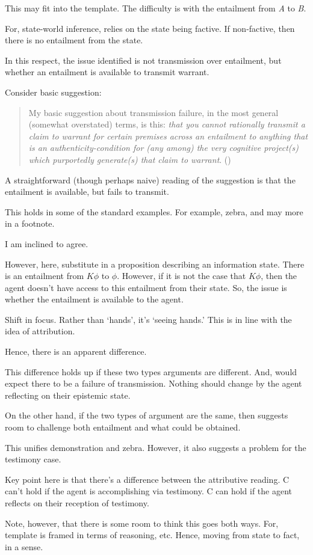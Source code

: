 \documentclass[10pt]{article}
\newcommand{\hozline}[0]{%
  \noindent\hdashrule[0.5ex][c]{\textwidth}{.1pt}{}
}
\begin{document}
\begin{note}[Literature]
  This may fit into the template.
  The difficulty is with the entailment from \emph{A} to \emph{B}.

  For, state-world inference, relies on the state being factive.
  If non-factive, then there is no entailment from the state.

  In this respect, the issue identified is not transmission over entailment, but whether an entailment is available to transmit warrant.
  
  Consider \citeauthor{Wright:2012uy} basic suggestion:
  \begin{quote}
    My basic suggestion about transmission failure, in the most general (somewhat overstated) terms, is this: \emph{that you cannot rationally transmit a claim to warrant for certain premises across an entailment to anything that is an authenticity-condition for (any among) the very cognitive project(s) which purportedly generate(s) that claim to warrant}.\nolinebreak
    \mbox{}\hfill\mbox{(\citeyear[467--468]{Wright:2012uy})}
  \end{quote}
  A straightforward (though perhaps naive) reading of the suggestion is that the entailment is available, but fails to transmit.

  This holds in some of the standard examples.
  For example, zebra, and may more in a footnote.

  I am inclined to agree.

  However, here, substitute in a proposition describing an information state.
  There is an entailment from \(K\phi\) to \(\phi\).
  However, if it is not the case that \(K\phi\), then the agent doesn't have access to this entailment from their state.
  So, the issue is whether the entailment is available to the agent.

  Shift in focus.
  Rather than `hands', it's `seeing hands.'
  This is in line with the idea of attribution.

  Hence, there is an apparent difference.

  This difference holds up if these two types arguments are different.
  And, would expect there to be a failure of transmission.
  Nothing should change by the agent reflecting on their epistemic state.

  On the other hand, if the two types of argument are the same, then suggests room to challenge both entailment and what could be obtained.

  \hozline

  This unifies demonstration and zebra.
  However, it also suggests a problem for the testimony case.

  Key point here is that there's a difference between the attributive reading.
  C can't hold if the agent is accomplishing via testimony.
  C can hold if the agent reflects on their reception of testimony.

  {
    \color{red}
    Note, however, that there is some room to think this goes both ways.
    For, template is framed in terms of reasoning, etc.
    Hence, moving from state to fact, in a sense.
  }
\end{note}
\end{document}
